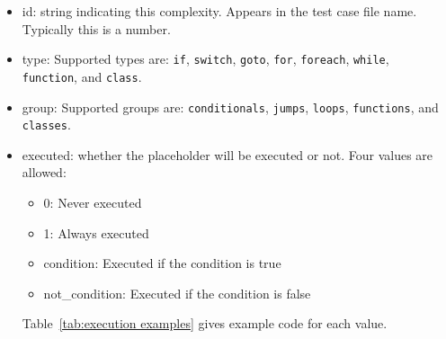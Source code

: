 \documentclass[12pt]{article}
\begin{document}
\begin{itemize}
    \item id: string indicating this complexity.  Appears in the test case
      file name.  Typically this is a number.

    \item type: Supported types are: \verb|if|, \verb|switch|, \verb|goto|, 
    \verb|for|, \verb|foreach|, \verb|while|, \\
    \verb|function|, and \verb|class|.

    \item group: Supported groups are: \verb|conditionals|, \verb|jumps|, 
    \verb|loops|, \verb|functions|, and \\ \verb|classes|.

    \item executed: whether the placeholder will be executed or not. Four 
    values are allowed:
    \begin{itemize}
        \item 0: Never executed
        \item 1: Always executed
        \item condition:  Executed if the condition is true
        \item not\_condition:  Executed if the condition is false
    \end{itemize}
    Table~\ref{tab:execution examples} gives example code for each value.


\end{itemize}
\end{document}
